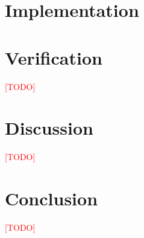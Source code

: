 \documentclass[a4paper]{report}
\newcommand\TODO{\textcolor{red}{[TODO]}}
\begin{document}
\chapter{Implementation}
    \label{ch:implementation}
    

\chapter{Verification}
    \label{ch:verification}
    \TODO

\chapter{Discussion}
    \label{ch:discussion}
    \TODO

\chapter{Conclusion}
    \label{ch:conclusion}
    \TODO



\end{document}
